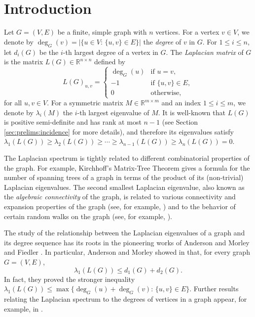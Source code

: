 \documentclass[a4paper,11pt]{article}
\theoremstyle{plain}
\theoremstyle{definition}
\numberwithin{theorem}{section}
\numberwithin{equation}{section}
\newcommand{\Rea}{{\mathbb R}}
\providecommand{\keyword}[1]
{
  {\small	
  \textbf{\textit{Keywords:~}} #1}
}
\begin{document}


\section{Introduction}

Let $G=(V,E)$ be a finite, simple graph with $n$ vertices. For a vertex $v\in V$, we denote by $\deg_G(v)=|\{u\in V:\, \{u,v\}\in E\}|$ the \emph{degree} of $v$ in $G$. For $1\le i\le n$, let $d_i(G)$ be the $i$-th largest degree of a vertex in $G$. The \emph{Laplacian matrix} of $G$ is the matrix $L(G)\in \Rea^{n \times n}$ defined by
\[
    L(G)_{u,v}=\begin{cases}
        \deg_G(u) & \text{if } u=v,\\
        -1 & \text{if } \{u,v\}\in E,\\
        0 & \text{otherwise,}
    \end{cases}
\]
for all $u,v\in V$. 
For a symmetric matrix $M\in \Rea^{m\times m}$ and an index $1\le i\le m$, we denote by $\lambda_i(M)$ the $i$-th largest eigenvalue of $M$. It is well-known that $L(G)$ is positive semi-definite and has rank at most $n-1$ (see Section \ref{sec:prelims:incidence} for more details), and therefore its eigenvalues satisfy $\lambda_1(L(G))\ge \lambda_2(L(G))\ge \cdots\ge \lambda_{n-1}(L(G))\ge \lambda_n(L(G))=0$.

The Laplacian spectrum is tightly related to different combinatorial properties of the graph. For example, Kirchhoff's Matrix-Tree Theorem \cite{kirchhoff1847ueber} gives a formula for the number of spanning trees of a graph in terms of the product of its (non-trivial) Laplacian eigenvalues.
The second smallest Laplacian eigenvalue, also known as the \emph{algebraic connectivity} of the graph, is related to various connectivity and expansion properties of the graph (see, for example, \cite{fiedler1973algebraic,alon1985lambda1,mohar1989isoperimetric}) and to the behavior of certain random walks on the graph (see, for example, \cite{caputo2010aldous}).

The study of the relationship between the Laplacian eigenvalues of a graph and its degree sequence has its roots in the pioneering works of Anderson and Morley \cite{anderson1985eigenvalues} and Fiedler \cite{fiedler1973algebraic}. In particular, Anderson and Morley showed in \cite[Theorem 2]{anderson1985eigenvalues} that, for every graph $G=(V,E)$,
\begin{equation}\label{eq:anderson_morley}
    \lambda_1(L(G))\le d_1(G)+d_2(G).
\end{equation}
In fact, they proved the stronger inequality $\lambda_1(L(G))\le \max\{\deg_G(u)+\deg_G(v):\, \{u,v\}\in E\}$. Further results relating the Laplacian spectrum to the degrees of vertices in a graph appear, for example, in \cite{li1997upper,li2000note,brouwer2008lower}.
\end{document}
